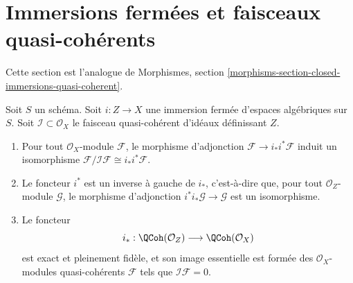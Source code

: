 \section{Immersions fermées et faisceaux quasi-cohérents}
\label{section-closed-immersions-quasi-coherent}

\noindent
Cette section est l'analogue de
Morphismes, section \ref{morphisms-section-closed-immersions-quasi-coherent}.

\begin{lemma}
\label{lemma-i-star-equivalence}
Soit $S$ un schéma. Soit $i : Z \to X$ une immersion fermée d'espaces
algébriques sur $S$. Soit $\mathcal{I} \subset \mathcal{O}_X$ le faisceau
quasi-cohérent d'idéaux définissant $Z$.
\begin{enumerate}
\item Pour tout $\mathcal{O}_X$-module $\mathcal{F}$, le morphisme d'adjonction
$\mathcal{F} \to i_*i^*\mathcal{F}$ induit un isomorphisme
$\mathcal{F}/\mathcal{I}\mathcal{F} \cong i_*i^*\mathcal{F}$.
\item Le foncteur $i^*$ est un inverse à gauche de $i_*$, c'est-à-dire que, pour tout
$\mathcal{O}_Z$-module $\mathcal{G}$, le morphisme d'adjonction
$i^*i_*\mathcal{G} \to \mathcal{G}$ est un isomorphisme.
\item Le foncteur
$$
i_* :
\QCoh(\mathcal{O}_Z)
\longrightarrow
\QCoh(\mathcal{O}_X)
$$
est exact et pleinement fidèle, et son image essentielle est formée des
$\mathcal{O}_X$-modules quasi-cohérents $\mathcal{F}$ tels que $\mathcal{I}\mathcal{F} = 0$.
\end{enumerate}
\end{lemma}

